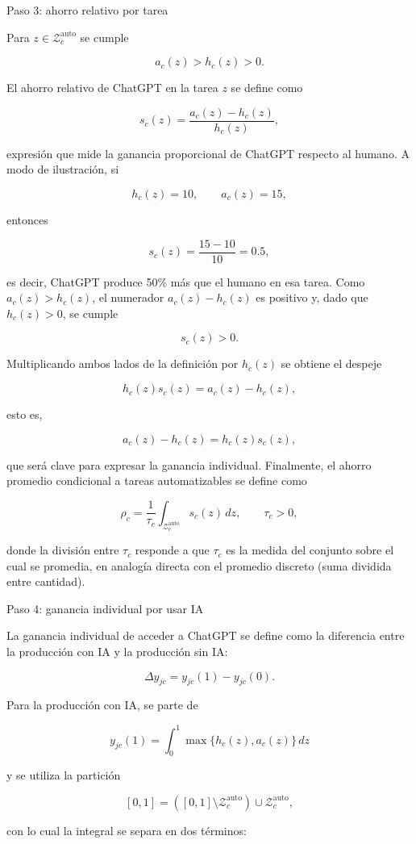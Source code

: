 \documentclass[12pt,a4paper]{article}
\let\textbf\textmd
\newcommand{\Zauto}{\mathcal{Z}^{\mathrm{auto}}_c}
\newcommand{\dd}{\,dz}
\begin{document}
\bigskip
\noindent\textbf{Paso 3: ahorro relativo por tarea}

\medskip
\noindent Para $z\in\Zauto$ se cumple

\[
a_c(z)>h_c(z)>0.
\]

El ahorro relativo de ChatGPT en la tarea $z$ se define como

\[
s_c(z)=\frac{a_c(z)-h_c(z)}{h_c(z)},
\]

expresión que mide la ganancia proporcional de ChatGPT respecto al humano. A modo de ilustración, si

\[
h_c(z)=10,\qquad a_c(z)=15,
\]

entonces

\[
s_c(z)=\frac{15-10}{10}=0.5,
\]

es decir, ChatGPT produce 50\% más que el humano en esa tarea. Como $a_c(z)>h_c(z)$, el numerador $a_c(z)-h_c(z)$ es positivo y, dado que $h_c(z)>0$, se cumple

\[
s_c(z)>0.
\]

Multiplicando ambos lados de la definición por $h_c(z)$ se obtiene el despeje

\[
h_c(z)s_c(z)=a_c(z)-h_c(z),
\]

esto es,

\[
a_c(z)-h_c(z)=h_c(z)s_c(z),
\]

que será clave para expresar la ganancia individual. Finalmente, el ahorro promedio condicional a tareas automatizables se define como

\[
\rho_c=\frac{1}{\tau_c}\int_{\Zauto}s_c(z)\dd,
\qquad \tau_c>0,
\]

donde la división entre $\tau_c$ responde a que $\tau_c$ es la medida del conjunto sobre el cual se promedia, en analogía directa con el promedio discreto (suma dividida entre cantidad).

\bigskip
\noindent\textbf{Paso 4: ganancia individual por usar IA}

\medskip
\noindent La ganancia individual de acceder a ChatGPT se define como la diferencia entre la producción con IA y la producción sin IA:

\[
\Delta y_{jc}=y_{jc}(1)-y_{jc}(0).
\]

Para la producción con IA, se parte de

\[
y_{jc}(1)=\int_0^1\max\{h_c(z),a_c(z)\}\dd
\]

y se utiliza la partición

\[
[0,1]=([0,1]\setminus\Zauto)\cup\Zauto,
\]

con lo cual la integral se separa en dos términos:
\end{document}
